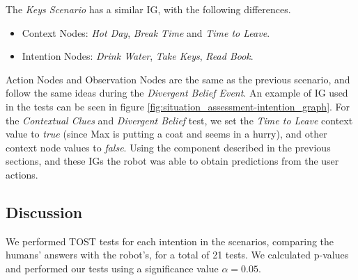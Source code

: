 The \textit{Keys Scenario} has a similar IG, with the following differences.
\begin{itemize}
\item Context Nodes: \textit{Hot Day}, \textit{Break Time} and \textit{Time to Leave}.
\item Intention Nodes: \textit{Drink Water}, \textit{Take Keys}, \textit{Read Book}.
\end{itemize}

Action Nodes and Observation Nodes are the same as the previous scenario, and follow the same ideas during the \textit{Divergent Belief Event}. An example of IG used in the tests can be seen in figure \ref{fig:situation_assessment-intention_graph}. For the \textit{Contextual Clues} and \textit{Divergent Belief} test, we set the \textit{Time to Leave} context value to \textit{true} (since Max is putting a coat and seems in a hurry), and other context node values to \textit{false}. Using the component described in the previous sections, and these IGs the robot was able to obtain predictions from the user actions.

\subsection{Discussion}
\label{sec:discussion}
We performed TOST tests for each intention in the scenarios, comparing the humans' answers with the robot's, for a total of 21 tests. We calculated p-values and performed our tests using a significance value $\alpha=0.05$.

